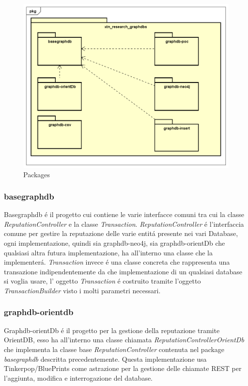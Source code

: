 \begin{figure}[ht]
	\centering
	\includegraphics[scale=0.70]{diagram/img/packages.png}
	\caption{Packages}
\end{figure}

\subsubsection{basegraphdb}
Basegraphdb \'e il progetto cui contiene le varie interfacce comuni tra cui la classe \textit{ReputationController} e la classe \textit{Transaction}.
\textit{ReputationController} \'e l'interfaccia comune per gestire la reputazione delle varie entit\'a presente nei vari Database, ogni implementazione, quindi sia graphdb-neo4j, sia graphdb-orientDb che qualsiasi altra futura implementazione, ha all'interno una classe che la implementer\'a. \textit{Transaction} invece \'e una classe concreta che rappresenta una transazione indipendentemente da che implementazione di un qualsiasi database si voglia usare, l' oggetto \textit{Transaction} \'e costruito tramite l'oggetto \textit{TransactionBuilder} visto i molti parametri necessari.

\subsubsection{graphdb-orientdb}
Graphdb-orientDb \'e il progetto per la gestione della reputazione tramite OrientDB, esso ha all'interno una classe chiamata \textit{ReputationControllerOrientDb} che implementa la classe base \textit{ReputationController} contenuta nel package \textit{basegraphdb} descritta precedentemente. Questa implementazione usa Tinkerpop/BluePrints come astrazione per la gestione delle chiamate REST per l'aggiunta, modifica e interrogazione del database.

